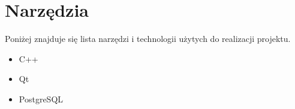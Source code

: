 \chapter{Narzędzia}
\label{ap:1}

Poniżej znajduje się lista narzędzi i technologii użytych do realizacji projektu.

\begin{itemize}

\item C++
\item Qt
\item PostgreSQL

\end{itemize}